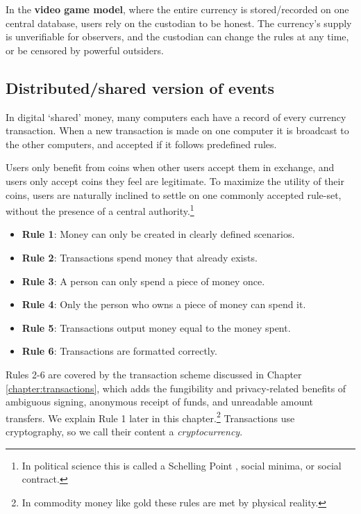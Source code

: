 In the \textbf{video game model}, where the entire currency is stored/recorded on one central database, users rely on the custodian to be honest. The currency's supply is unverifiable for observers, and the custodian can change the rules at any time, or be censored by powerful outsiders.


\subsection{Distributed/shared version of events}
\label{subsec:shared-version-events}

In digital `shared' money, many computers each have a record of every currency transaction. When a new transaction is made on one computer it is broadcast to the other computers, and accepted if it follows predefined rules.

Users only benefit from coins when other users accept them in exchange, and users only accept coins they feel are legitimate. To maximize the utility of their coins, users are naturally inclined to settle on one commonly accepted rule-set, without the presence of a central authority.\footnote{In political science this is called a Schelling Point \cite{friedman-schelling}, social minima, or social contract.}
\begin{itemize}
    \item[] \textbf{Rule 1}: Money can only be created in clearly defined scenarios.
    \item[] \textbf{Rule 2}: Transactions spend money that already exists.
    \item[] \textbf{Rule 3}: A person can only spend a piece of money once.
    \item[] \textbf{Rule 4}: Only the person who owns a piece of money can spend it.
    \item[] \textbf{Rule 5}: Transactions output money equal to the money spent.
    \item[] \textbf{Rule 6}:  Transactions are formatted correctly.
\end{itemize}

Rules 2-6 are covered by the transaction scheme discussed in Chapter \ref{chapter:transactions}, which adds the fungibility and privacy-related benefits of ambiguous signing, anonymous receipt of funds, and unreadable amount transfers. We explain Rule 1 later in this chapter.\footnote{In commodity money like gold these rules are met by physical reality.} Transactions use cryptography, so we call their content a {\em cryptocurrency}.

